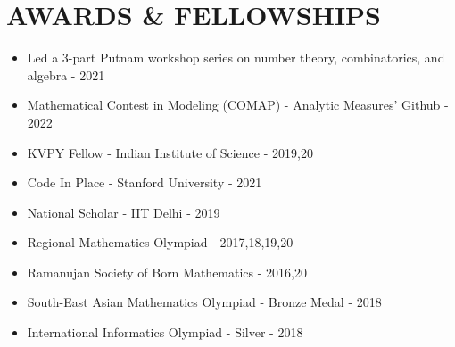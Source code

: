 \documentclass[letterpaper,11pt]{article}
\begin{document}
\section{AWARDS \& FELLOWSHIPS}
\begin{multicols}{2}
\begin{itemize}[itemsep=-2pt, parsep=5pt]
  \item{Led a 3-part Putnam workshop series on number theory, combinatorics, and algebra - 2021}
  \item{Mathematical Contest in Modeling (COMAP) - Analytic Measures' Github - 2022}
  \item{{KVPY Fellow - Indian Institute of Science - 2019,20}}
  \item{Code In Place - Stanford University - 2021}
  \item{National Scholar - IIT Delhi - 2019}
  \item{Regional Mathematics Olympiad - 2017,18,19,20}
  \item{Ramanujan Society of Born Mathematics - 2016,20}
  \item{South-East Asian Mathematics Olympiad - Bronze Medal - 2018}
  \item{International Informatics Olympiad - Silver - 2018}
\end{itemize}
\end{multicols}
\vspace*{2.0\multicolsep}
\end{document}
